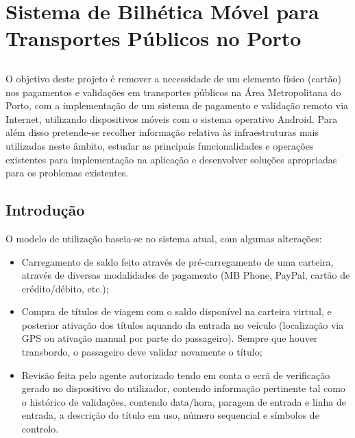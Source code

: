 \chapter{Sistema de Bilhética Móvel para Transportes Públicos no Porto}\label{chap:projeto}

\section*{}

O objetivo deste projeto é remover a necessidade de um elemento físico (cartão) nos pagamentos e validações em transportes públicos na Área Metropolitana do Porto, com a implementação de um sistema de pagamento e validação remoto via Internet, utilizando dispositivos móveis com o sistema operativo Android. Para além disso pretende-se recolher informação relativa às infraestruturas mais utilizadas neste âmbito, estudar as principais funcionalidades e operações existentes para implementação na aplicação e desenvolver soluções apropriadas para os problemas existentes.

\section{Introdução}

O modelo de utilização baseia-se no sistema atual, com algumas alterações:
\begin{itemize}
\item Carregamento de saldo feito através de pré-carregamento de uma carteira, através de diversas modalidades de pagamento (MB Phone, PayPal, cartão de crédito/débito, etc.);
\item Compra de títulos de viagem com o saldo disponível na carteira virtual, e posterior ativação dos títulos aquando da entrada no veículo (localização via GPS ou ativação manual por parte do passageiro). Sempre que houver transbordo, o passageiro deve validar novamente o título;
\item Revisão feita pelo agente autorizado tendo em conta o ecrã de verificação gerado no dispositivo do utilizador, contendo informação pertinente tal como o histórico de validações, contendo data/hora, paragem de entrada e linha de entrada, a descrição do título em uso, número sequencial e símbolos de controlo.
\end{itemize}


